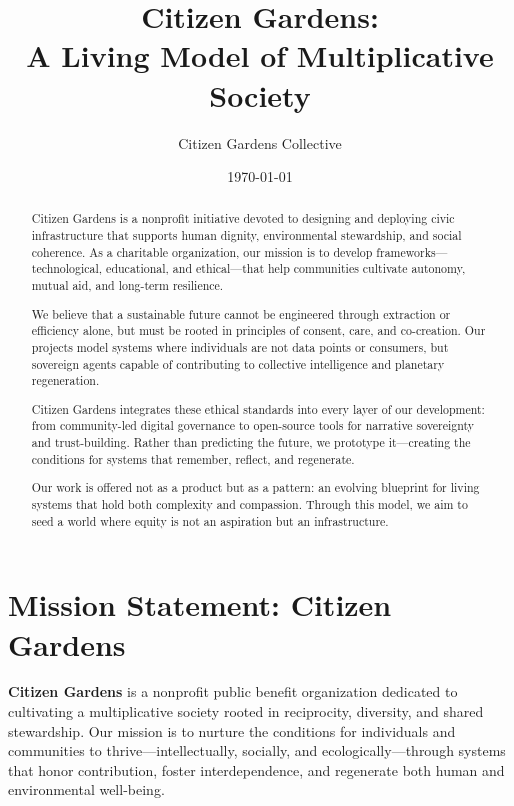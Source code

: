 \documentclass[12pt]{article}
\title{Citizen Gardens: \\ \large 
A Living Model of Multiplicative Society}
\author{Citizen Gardens Collective}
\date{\today}
\begin{document}
\maketitle

\begin{abstract}
\noindent
Citizen Gardens is a nonprofit initiative devoted to designing and deploying civic infrastructure that supports human dignity, environmental stewardship, and social coherence. As a charitable organization, our mission is to develop frameworks—technological, educational, and ethical—that help communities cultivate autonomy, mutual aid, and long-term resilience.

We believe that a sustainable future cannot be engineered through extraction or efficiency alone, but must be rooted in principles of consent, care, and co-creation. Our projects model systems where individuals are not data points or consumers, but sovereign agents capable of contributing to collective intelligence and planetary regeneration.

Citizen Gardens integrates these ethical standards into every layer of our development: from community-led digital governance to open-source tools for narrative sovereignty and trust-building. Rather than predicting the future, we prototype it—creating the conditions for systems that remember, reflect, and regenerate.

Our work is offered not as a product but as a pattern: an evolving blueprint for living systems that hold both complexity and compassion. Through this model, we aim to seed a world where equity is not an aspiration but an infrastructure.

\end{abstract}


\newpage
\section*{Mission Statement: Citizen Gardens}

\textbf{Citizen Gardens} is a nonprofit public benefit organization dedicated to cultivating a multiplicative society rooted in reciprocity, diversity, and shared stewardship. Our mission is to nurture the conditions for individuals and communities to thrive—intellectually, socially, and ecologically—through systems that honor contribution, foster interdependence, and regenerate both human and environmental well-being.

\vspace{1em}
\end{document}

